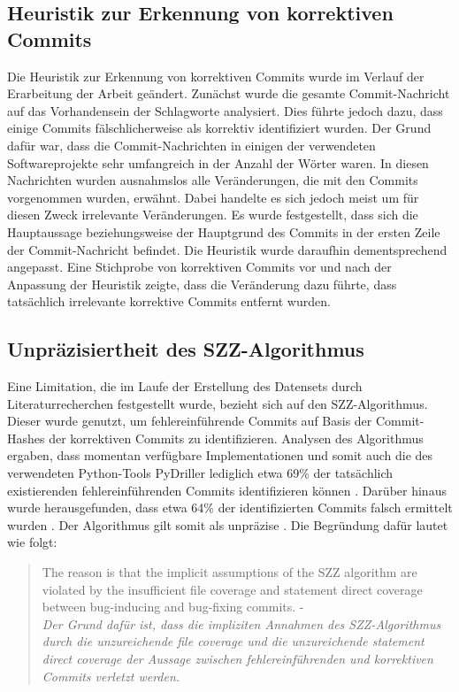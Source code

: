 \subsection*{Heuristik zur Erkennung von korrektiven Commits}

Die Heuristik zur Erkennung von korrektiven Commits wurde im Verlauf der Erarbeitung der Arbeit geändert. Zunächst wurde die gesamte Commit-Nachricht auf das Vorhandensein der Schlagworte analysiert. Dies führte jedoch dazu, dass einige Commits fälschlicherweise als korrektiv identifiziert wurden. Der Grund dafür war, dass die Commit-Nachrichten in einigen der verwendeten Softwareprojekte sehr umfangreich in der Anzahl der Wörter waren. In diesen Nachrichten wurden ausnahmslos alle Veränderungen, die mit den Commits vorgenommen wurden, erwähnt. Dabei handelte es sich jedoch meist um für diesen Zweck irrelevante Veränderungen. Es wurde festgestellt, dass sich die Hauptaussage beziehungsweise der Hauptgrund des Commits in der ersten Zeile der Commit-Nachricht befindet. Die Heuristik wurde daraufhin dementsprechend angepasst. Eine Stichprobe von korrektiven Commits vor und nach der Anpassung der Heuristik zeigte, dass die Veränderung dazu führte, dass tatsächlich irrelevante korrektive Commits entfernt wurden.

\subsection*{Unpräzisiertheit des SZZ-Algorithmus}

Eine Limitation, die im Laufe der Erstellung des Datensets durch Literaturrecherchen festgestellt wurde, bezieht sich auf den SZZ-Algorithmus. Dieser wurde genutzt, um fehlereinführende Commits auf Basis der Commit-Hashes der korrektiven Commits zu identifizieren. Analysen des Algorithmus ergaben, dass momentan verfügbare Implementationen und somit auch die des verwendeten Python-Tools PyDriller lediglich etwa 69\% der tatsächlich existierenden fehlereinführenden Commits identifizieren können \cite{Wen2019}. Darüber hinaus wurde herausgefunden, dass etwa 64\% der identifizierten Commits falsch ermittelt wurden \cite{Wen2019}. Der Algorithmus gilt somit als unpräzise \cite{Wen2019}. Die Begründung dafür lautet wie folgt:

\begin{quotation}
The reason is that the implicit assumptions of the SZZ algorithm
are violated by the insufficient file coverage and statement direct
coverage between bug-inducing and bug-fixing commits. - \cite{Wen2019}
\medskip \\
\textit{Der Grund dafür ist, dass die impliziten Annahmen des SZZ-Algorithmus durch die unzureichende \glqq file coverage\grqq{} und die unzureichende \glqq statement direct
coverage\grqq{} der Aussage zwischen fehlereinführenden und korrektiven Commits verletzt werden.}
\end{quotation}

